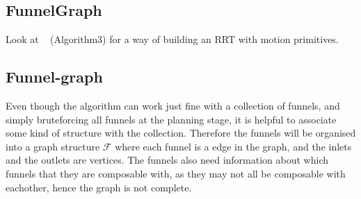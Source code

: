 \subsection{FunnelGraph}

Look at ~\cite{vonasekGlobalMotionPlanning2013} (Algorithm3) for a way of
building an RRT with motion primitives.

\subsection{Funnel-graph}

Even though the \rrtfunnel{} algorithm can work just fine with a collection of
funnels, and simply bruteforcing all funnels at the planning stage, it is
helpful to associate some kind of structure with the collection. Therefore the
funnels will be organised into a graph structure \(\mathcal{F}\) where each
funnel is a edge in the graph, and the inlets and the outlets are vertices. The
funnels also need information about which funnels that they are composable with,
as they may not all be composable with eachother, hence the graph is not
complete.

